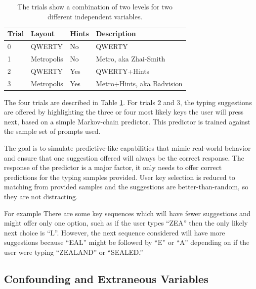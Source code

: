 \documentclass[english]{vgtc}
\begin{document}
\begin{table}[tbp]
  \centering
  \begin{tabular}{@{}llll@{}}
  \toprule
  Trial & Layout     & Hints & Description \\ \midrule
  0     & QWERTY     & No    & QWERTY    \\
  1     & Metropolis & No    & Metro, aka Zhai-Smith  \\
  2     & QWERTY     & Yes   & QWERTY+Hints  \\
  3     & Metropolis & Yes   & Metro+Hints, aka Badvision   \\ \bottomrule
  \end{tabular}
  \caption{The trials show a combination of two levels for two different independent variables.}
  \label{table:trials}
\end{table}

The four trials are described in Table \ref{table:trials}. For trials
2 and 3, the typing suggestions are offered by highlighting the three
or four most likely keys the user will press next, based on a simple
Markov-chain predictor.  This predictor is  trained against the sample 
set of prompts used. 

The goal is to simulate predictive-like capabilities that
mimic real-world behavior and ensure that one suggestion offered will
always be the correct response. The response of the predictor is a
major factor, it only needs to offer correct predictions
for the typing samples provided.  User key selection is
reduced to matching from provided samples and the suggestions are
better-than-random, so they are not distracting. 

For example There are some key sequences which will have fewer 
suggestions and might offer only one option, such as if the user types 
\textquotedblleft ZEA\textquotedblright{}
then the only likely next choice is \textquotedblleft L\textquotedblright .
However, the next sequence considered will have more suggestions because
\textquotedblleft EAL\textquotedblright{} might be followed by \textquotedblleft E\textquotedblright{}
or \textquotedblleft A\textquotedblright{} depending on if the user
were typing \textquotedblleft ZEALAND\textquotedblright{} or \textquotedblleft SEALED.\textquotedblright{} 

\subsection{Confounding and Extraneous Variables}
\end{document}
